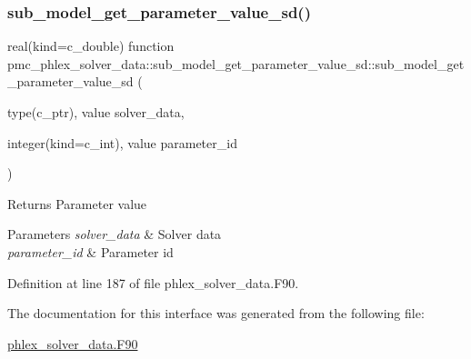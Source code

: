 \subsubsection{\texorpdfstring{sub\+\_\+model\+\_\+get\+\_\+parameter\+\_\+value\+\_\+sd()}{sub\_model\_get\_parameter\_value\_sd()}}
{\footnotesize\ttfamily real(kind=c\+\_\+double) function pmc\+\_\+phlex\+\_\+solver\+\_\+data\+::sub\+\_\+model\+\_\+get\+\_\+parameter\+\_\+value\+\_\+sd\+::sub\+\_\+model\+\_\+get\+\_\+parameter\+\_\+value\+\_\+sd (\begin{DoxyParamCaption}\item[{type(c\+\_\+ptr), value}]{solver\+\_\+data,  }\item[{integer(kind=c\+\_\+int), value}]{parameter\+\_\+id }\end{DoxyParamCaption})\hspace{0.3cm}{\ttfamily [private]}}

\begin{DoxyReturn}{Returns}
Parameter value
\end{DoxyReturn}

\begin{DoxyParams}{Parameters}
{\em solver\+\_\+data} & Solver data\\
\hline
{\em parameter\+\_\+id} & Parameter id \\
\hline
\end{DoxyParams}


Definition at line 187 of file phlex\+\_\+solver\+\_\+data.\+F90.



The documentation for this interface was generated from the following file\+:\begin{DoxyCompactItemize}
\item 
\mbox{\hyperlink{phlex__solver__data_8_f90}{phlex\+\_\+solver\+\_\+data.\+F90}}\end{DoxyCompactItemize}
